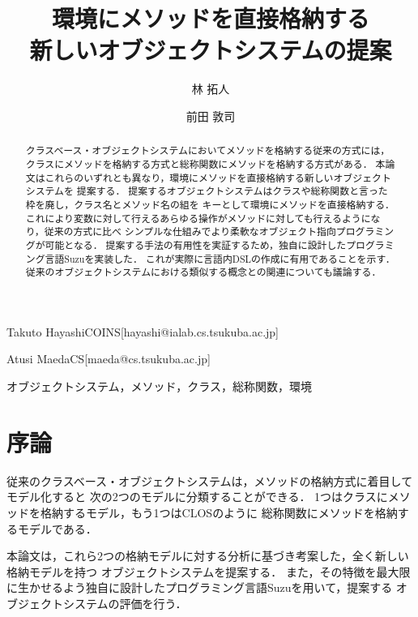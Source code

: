 \documentclass{ipsjprosym}
\begin{document}
\title{環境にメソッドを直接格納する \\ 新しいオブジェクトシステムの提案}


\author{林 拓人}{Takuto Hayashi}{COINS}[hayashi@ialab.cs.tsukuba.ac.jp]
\author{前田 敦司}{Atusi Maeda}{CS}[maeda@cs.tsukuba.ac.jp]

\begin{abstract}
クラスベース・オブジェクトシステムにおいてメソッドを格納する従来の方式には，
クラスにメソッドを格納する方式と総称関数にメソッドを格納する方式がある．
本論文はこれらのいずれとも異なり，環境にメソッドを直接格納する新しいオブジェクトシステムを
提案する．
提案するオブジェクトシステムはクラスや総称関数と言った枠を廃し，クラス名とメソッド名の組を
キーとして環境にメソッドを直接格納する．
これにより変数に対して行えるあらゆる操作がメソッドに対しても行えるようになり，従来の方式に比べ
シンプルな仕組みでより柔軟なオブジェクト指向プログラミングが可能となる．
提案する手法の有用性を実証するため，独自に設計したプログラミング言語Suzuを実装した．
これが実際に言語内DSLの作成に有用であることを示す．
従来のオブジェクトシステムにおける類似する概念との関連についても議論する．
\end{abstract}

\begin{jkeyword}
オブジェクトシステム，メソッド，クラス，総称関数，環境
\end{jkeyword}

\maketitle

\section{序論}

従来のクラスベース・オブジェクトシステムは，メソッドの格納方式に着目してモデル化すると
次の2つのモデルに分類することができる．
1つはクラスにメソッドを格納するモデル，もう1つはCLOS\cite{Ida:2010}のように
総称関数にメソッドを格納するモデルである．

本論文は，これら2つの格納モデルに対する分析に基づき考案した，全く新しい格納モデルを持つ
オブジェクトシステムを提案する．
また，その特徴を最大限に生かせるよう独自に設計したプログラミング言語Suzuを用いて，提案する
オブジェクトシステムの評価を行う．
\end{document}

